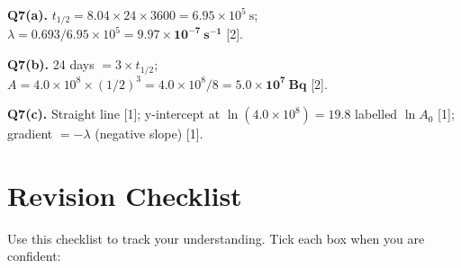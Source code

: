 \begin{markscheme}
\vspace{0.5em}\textbf{Q7(a).} $t_{1/2} = 8.04 \times 24 \times 3600 = 6.95\times10^5\ \text{s}$; $\lambda = 0.693/6.95\times10^5 = \mathbf{9.97\times10^{-7}\ \text{s}^{-1}}$ [2].

\vspace{0.5em}\textbf{Q7(b).} 24 days $= 3 \times t_{1/2}$; $A = 4.0\times10^8 \times (1/2)^3 = 4.0\times10^8/8 = \mathbf{5.0\times10^7\ \text{Bq}}$ [2].

\vspace{0.5em}\textbf{Q7(c).} Straight line [1]; y-intercept at $\ln(4.0\times10^8) = 19.8$ labelled $\ln A_0$ [1]; gradient $= -\lambda$ (negative slope) [1].

\end{markscheme}

\newpage
\section{Revision Checklist}

Use this checklist to track your understanding. Tick each box when you are confident:

